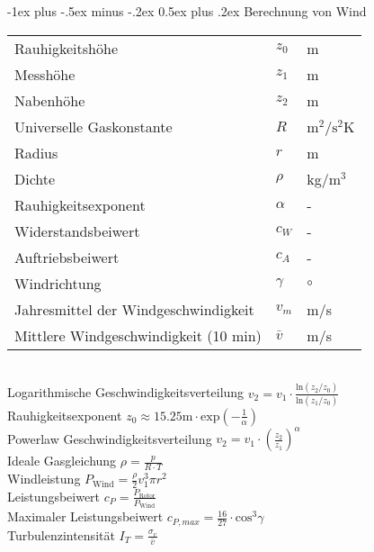 \documentclass[10pt,landscape]{article}
\makeatletter
\renewcommand{\section}{\@startsection{section}{1}{0mm}%
                                {-1ex plus -.5ex minus -.2ex}%
                                {0.5ex plus .2ex}%
                                {\normalfont\large\bfseries}}
\makeatother
\begin{document}
\begin{multicols}{3}
\section{Berechnung von Wind}
\begin{tabular}{lll}
	Rauhigkeitsh\"ohe & $z_0$ & m \\
	Messh\"ohe & $z_1$ & m \\
	Nabenh\"ohe & $z_2$ & m \\
	Universelle Gaskonstante & $R$ & $\text{m}^2/\text{s}^2$K \\
	Radius & $r$  & m\\
	Dichte & $\rho$  & kg/$\text{m}^3$\\
	Rauhigkeitsexponent & $\alpha$ & - \\
	Widerstandsbeiwert & $c_W$  & - \\
	Auftriebsbeiwert & $c_A$  & - \\
	Windrichtung & $\gamma$  & $\circ$\\
	Jahresmittel der Windgeschwindigkeit & $v_m$  & m/s\\
	Mittlere Windgeschwindigkeit (10 min) & $\bar{v}$ & m/s\\
\end{tabular}\\
\vspace{3pt}
Logarithmische Geschwindigkeitsverteilung $v_2 = v_1 \cdot \frac{\text{ln}(z_2/z_0)}{\text{ln}(z_1/z_0)}$\\
Rauhigkeitsexponent $z_0 \approx 15.25\text{m} \cdot \text{exp}(-\frac{1}{\alpha})$\\
\vspace{3pt}
Powerlaw Geschwindigkeitsverteilung $v_2 = v_1 \cdot (\frac{z_2}{z_1})^\alpha$\\
Ideale Gasgleichung $\rho = \frac{p}{R\cdot T}$\\
\vspace{3pt}
Windleistung $P_{\text{Wind}} = \frac{\rho}{2} v_1^3 \pi r^2$\\
\vspace{3pt}
Leistungsbeiwert $c_P = \frac{P_{\text{Rotor}}}{P_{\text{Wind}}}$\\
Maximaler Leistungsbeiwert $c_{P,max}=\frac{16}{27}\cdot \text{cos}^3\gamma$\\
\vspace{3pt}
Turbulenzintensit\"at $I_T = \frac{\sigma_v}{\bar{v}}$\\


\end{multicols}
\end{document}
